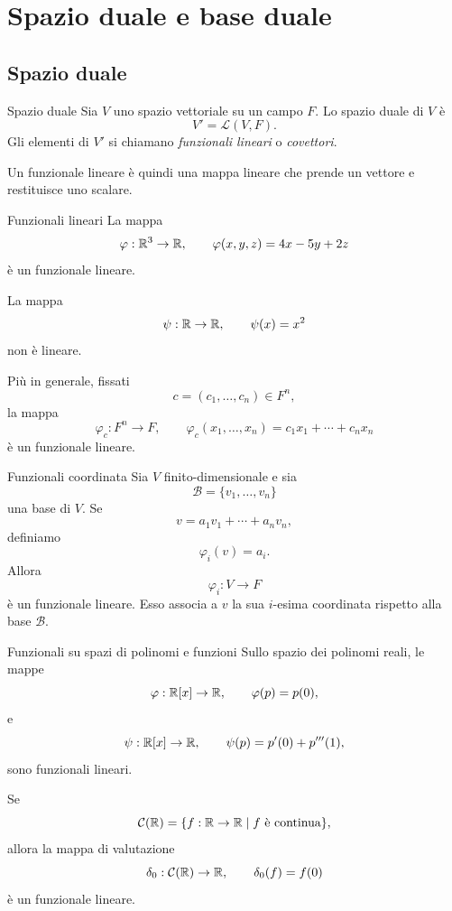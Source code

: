 \documentclass[a4paper]{article}
\begin{document}
\section{Spazio duale e base duale}

\subsection{Spazio duale}

\begin{snippetdefinition}{Spazio duale}
    Sia \(V\) uno spazio vettoriale su un campo \(F\). Lo spazio duale di \(V\) è
    \[
        V'=\mathcal{L}(V,F).
    \]
    Gli elementi di \(V'\) si chiamano \emph{funzionali lineari} o \emph{covettori}.
\end{snippetdefinition}

Un funzionale lineare è quindi una mappa lineare che prende un vettore e restituisce uno scalare.

\begin{snippetexample}{Funzionali lineari}
    La mappa
    \[
        \varphi:\mathbb{R}^3\to\mathbb{R},
        \qquad
        \varphi(x,y,z)=4x-5y+2z
    \]
    è un funzionale lineare.

    La mappa
    \[
        \psi:\mathbb{R}\to\mathbb{R},
        \qquad
        \psi(x)=x^2
    \]
    non è lineare.

    Più in generale, fissati
    \[
        c=(c_1,\ldots,c_n)\in F^n,
    \]
    la mappa
    \[
        \varphi_c:F^n\to F,
        \qquad
        \varphi_c(x_1,\ldots,x_n)=c_1x_1+\cdots+c_nx_n
    \]
    è un funzionale lineare.
\end{snippetexample}

\begin{snippetexample}{Funzionali coordinata}
    Sia \(V\) finito-dimensionale e sia
    \[
        \mathcal{B}=\{v_1,\ldots,v_n\}
    \]
    una base di \(V\). Se
    \[
        v=a_1v_1+\cdots+a_nv_n,
    \]
    definiamo
    \[
        \varphi_i(v)=a_i.
    \]
    Allora
    \[
        \varphi_i:V\to F
    \]
    è un funzionale lineare. Esso associa a \(v\) la sua \(i\)-esima coordinata rispetto alla base \(\mathcal{B}\).
\end{snippetexample}

\begin{snippetexample}{Funzionali su spazi di polinomi e funzioni}
    Sullo spazio dei polinomi reali, le mappe
    \[
        \varphi:\mathbb{R}[x]\to\mathbb{R},
        \qquad
        \varphi(p)=p(0),
    \]
    e
    \[
        \psi:\mathbb{R}[x]\to\mathbb{R},
        \qquad
        \psi(p)=p'(0)+p'''(1),
    \]
    sono funzionali lineari.

    Se
    \[
        \mathcal{C}(\mathbb{R})
        =
        \{f:\mathbb{R}\to\mathbb{R}\mid f \text{ è continua}\},
    \]
    allora la mappa di valutazione
    \[
        \delta_0:\mathcal{C}(\mathbb{R})\to\mathbb{R},
        \qquad
        \delta_0(f)=f(0)
    \]
    è un funzionale lineare.
\end{snippetexample}
\end{document}
